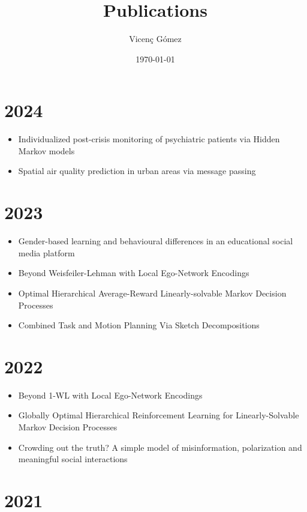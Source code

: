 \documentclass{article}
\title{Publications}
\author{Vicen\c{c} G\'omez}
\date{\today}
\begin{document}
\maketitle

\section*{2024}
\begin{itemize}
\item Individualized post-crisis monitoring of psychiatric patients via Hidden Markov models~\cite{garriga2024}
\item Spatial air quality prediction in urban areas via message passing~\cite{CALO2024108191}
\end{itemize}


\section*{2023}
\begin{itemize}
\item Gender-based learning and behavioural differences in an educational social media platform~\cite{theophilou2023}
\item Beyond Weisfeiler-Lehman with Local Ego-Network Encodings~\cite{make5040063}
\item Optimal Hierarchical Average-Reward Linearly-solvable Markov Decision Processes~\cite{molina2023optimal}
\item Combined Task and Motion Planning Via Sketch Decompositions~\cite{dalmau-planrob-2023}
\end{itemize}

\section*{2022}

\begin{itemize}
\item Beyond 1-WL with Local Ego-Network Encodings~\cite{alvarez-gonzalez2022beyond}
\item Globally Optimal Hierarchical Reinforcement Learning for Linearly-Solvable Markov Decision Processes~\cite{infante2022globally}
\item Crowding out the truth? A simple model of misinformation, polarization and meaningful social interactions~\cite{fabrizio-ic2s2-2022}
\end{itemize}

\section*{2021}
\end{document}
